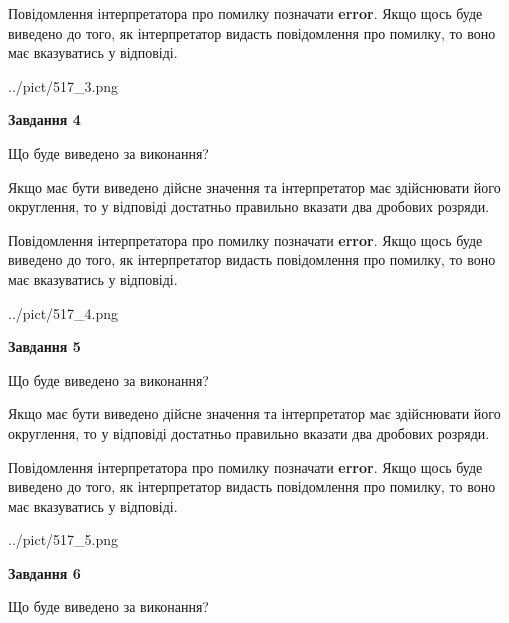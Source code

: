 \documentclass[12pt, ukrainian]{article}
\begin{document}
{\begin {Large}
Повідомлення інтерпретатора про помилку позначати \textbf{error}.
Якщо щось буде виведено до того, як інтерпретатор видасть повідомлення про помилку, 
то воно має вказуватись у відповіді. \par

\begin{center}
	{../pict/517_3.png}
\end{center}
\newpage

{\begin {center}\textbf{Завдання 4}\end {center}}\par
Що буде виведено за виконання? \par

Якщо має бути виведено дійсне значення та інтерпретатор має здійснювати його округлення, 
то у відповіді достатньо правильно вказати два дробових розряди.

Повідомлення інтерпретатора про помилку позначати \textbf{error}.
Якщо щось буде виведено до того, як інтерпретатор видасть повідомлення про помилку, 
то воно має вказуватись у відповіді. \par

\begin{center}
	{../pict/517_4.png}
\end{center}
\newpage

{\begin {center}\textbf{Завдання 5}\end {center}}\par
Що буде виведено за виконання? \par

Якщо має бути виведено дійсне значення та інтерпретатор має здійснювати його округлення, 
то у відповіді достатньо правильно вказати два дробових розряди.

Повідомлення інтерпретатора про помилку позначати \textbf{error}.
Якщо щось буде виведено до того, як інтерпретатор видасть повідомлення про помилку, 
то воно має вказуватись у відповіді. \par

\begin{center}
	{../pict/517_5.png}
\end{center}
\newpage

{\begin {center}\textbf{Завдання 6}\end {center}}\par
Що буде виведено за виконання? \par


\end{Large}}
\end{document}
